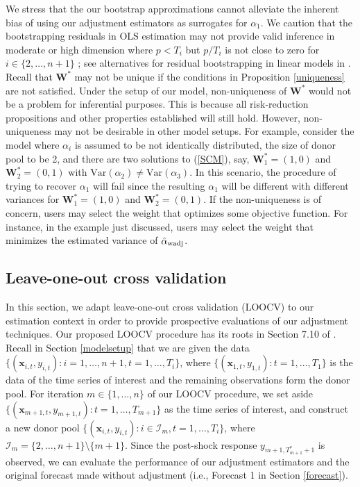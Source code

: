\documentclass[11pt]{article}
\def\mbf#1{\mathbf{#1}} %
\def\mc#1{\mathcal{#1}} %
\def\var#1{\mathrm{Var}(#1)} %
\theoremstyle{definition}
\begin{document}
We stress that the our bootstrap approximations cannot alleviate the inherent bias of using our adjustment estimators as surrogates for $\alpha_1$. We caution that the bootstrapping residuals in OLS estimation may not provide valid inference in moderate or high dimension where $p < T_i$ but $p / T_i$ is not close to zero for $i\in \{2, \ldots, n+1\}$ \citep{el2018can}; see alternatives for residual bootstrapping in linear models in \citet{el2018can}. Recall that $\mathbf{W}^*$  may not be unique if the conditions in Proposition \ref{uniqueness} are not satisfied. Under the setup of our model, non-uniqueness of $\mathbf{W}^*$ would not be a problem for inferential purposes. This is because all risk-reduction propositions and other properties established will still hold. However, non-uniqueness may not be desirable in other model setups. For example, consider the model where $\alpha_i$ is assumed to be not identically distributed, the size of  donor pool to be 2, and there are two solutions to (\ref{SCM}), say, $\mathbf{W}^*_1=(1,0)$ and  $\mathbf{W}^*_2=(0,1)$ with $\var{\alpha_2}\neq \var{\alpha_3}$. In this scenario, the procedure of trying to recover $\alpha_1$ will fail since the resulting $\alpha_1$ will be different with different variances for $\mathbf{W}^*_1=(1,0)$ and  $\mathbf{W}^*_2=(0,1)$. If the non-uniqueness is of concern, users may select the weight that optimizes some objective function. For instance, in the example just discussed, users may select the weight that minimizes the estimated variance of $\hat{\alpha}_{\rm wadj}$.

\subsection{Leave-one-out cross validation}
\label{loocv}

In this section, we adapt leave-one-out cross validation (LOOCV) to our estimation context in order to provide prospective evaluations of our adjustment techniques. Our proposed LOOCV procedure has its roots in Section 7.10 of \citet{hastie2009elements}.  Recall in Section \ref{modelsetup} that we are given the data $\{(\mbf{x}_{i,t}, y_{i,t}) \colon i = 1, \ldots, n+1, t = 1, \ldots, T_i\}$, where $\{(\mbf{x}_{1,t}, y_{1,t})\colon t = 1, \ldots, T_1\}$ is the data of the time series of interest and the remaining observations form the donor pool. For iteration $m \in \{1,\ldots,n\}$ of our LOOCV procedure, we set aside $\{(\mbf{x}_{m + 1, t}, y_{m + 1, t}) \colon t = 1, \ldots, T_{m+1}\}$ as the time series of interest, and construct a new donor pool $\{(\mbf{x}_{i, t}, y_{i, t}) \colon i \in \mc{I}_m, t = 1, \ldots, T_{i}\}$, where $\mc{I}_m=\{2, \ldots, n+1\} \setminus \{m+1\}$. Since the post-shock response $y_{m+1, T_{m+1}^*+1}$ is observed, we can evaluate the performance of our adjustment estimators and the original forecast made without adjustment (i.e., Forecast 1 in Section \ref{forecast}).
\end{document}
